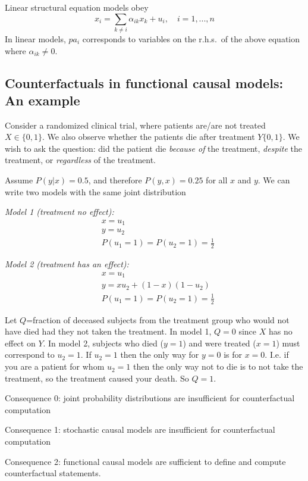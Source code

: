 \documentclass[11pt]{article}
\numberwithin{equation}{section}
\begin{document}
Linear structural equation models obey
\begin{equation}
x_i = \sum_{k \neq i} \alpha_{ik} x_k + u_i, \quad i=1,...,n 
\end{equation}
In linear models, $pa_i$ corresponds to variables on the r.h.s.\ of the above equation where $\alpha_{ik} \neq 0$.

\subsection{Counterfactuals in functional causal models: An example}
Consider a randomized clinical trial, where patients are/are not treated $X \in \{0,1\}$. We also observe whether the patients die after treatment $Y\{0,1\}$. We wish to ask the question: did the patient die \textit{because of} the treatment, \textit{despite} the treatment, or \textit{regardless} of the treatment.

Assume $P(y|x) = 0.5$, and therefore $P(y,x)=0.25$ for all $x$ and $y$. We can write two models with the same joint distribution

\textit{Model 1 (treatment no effect):}
\begin{align}
&x=u_1\\
&y=u_2\\
&P(u_1=1) = P(u_2=1)= \frac{1}{2}
\end{align}


\textit{Model 2 (treatment has an effect):}
\begin{align}
&x=u_1\\
&y=xu_2 + (1-x)(1-u_2)\\
&P(u_1=1) = P(u_2=1)= \frac{1}{2}
\end{align}

Let $Q$=fraction of deceased subjects from the treatment group who would not have died had they not taken the treatment. In model 1, $Q=0$ since $X$ has no effect on $Y$. In model 2, subjects who died ($y=1$) and were treated ($x=1$) must correspond to $u_2=1$. If $u_2=1$ then the only way for $y=0$ is for $x=0$. I.e. if you are a patient for whom $u_2=1$ then the only way not to die is to not take the treatment, so the treatment caused your death. So $Q=1$.

Consequence 0: joint probability distributions are insufficient for counterfactual computation

Consequence 1: stochastic causal models are insufficient for counterfactual computation

Consequence 2: functional causal models are sufficient to define and compute counterfactual statements.
\end{document}
